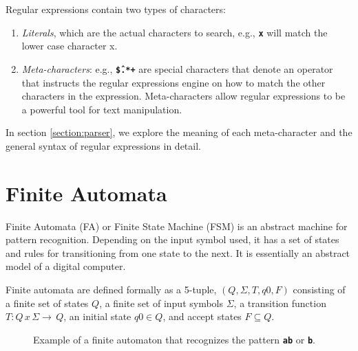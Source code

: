 Regular expressions contain two types of characters:
\begin{enumerate}
    \item \textit{Literals}, which are the actual characters to search, e.g., \texttt{\textbf{x}} will match the lower case character x.
    \item \textit{Meta-characters}: e.g., \texttt{\textbf{\^\$.*+}} are special characters that denote an operator that instructs the regular expressions engine on how to match the other characters in the expression. Meta-characters allow regular expressions to be a powerful tool for text manipulation.
\end{enumerate}

In section \ref{section:parser}, we explore the meaning of each meta-character and the general syntax of regular expressions in detail.

\section{Finite Automata}

Finite Automata (FA) or Finite State Machine (FSM) is an abstract machine for pattern recognition. Depending on the input symbol used, it has a set of states and rules for transitioning from one state to the next. It is essentially an abstract model of a digital computer. 

Finite automata are defined formally as a 5-tuple, $(Q, Σ, T, q0, F)$ consisting of a finite set of states $Q$, a finite set of input symbols $\Sigma$, a transition function $T: Q \, x \, Σ → \, Q$, an initial state $q0 ∈ Q$, and accept states $F \subseteq Q$.

\begin{figure}[H]
\centering
{}
\caption{Example of a finite automaton that recognizes the pattern \texttt{\textbf{ab}} or \texttt{\textbf{b}}.}\label{fig:fsm}
\end{figure}

